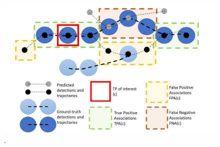 
\begin{figure}[ht]
    \centering
    \includegraphics[width=1\textwidth]{images/T/explanation.png}
    \caption{.}
    \label{img:road}
\end{figure}

